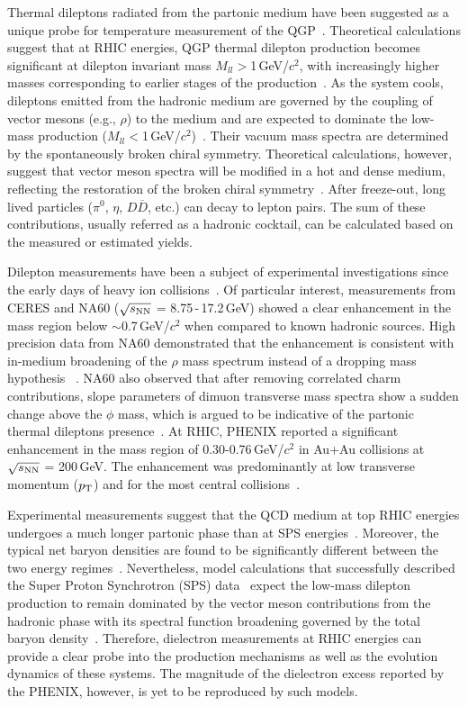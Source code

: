 \documentclass[twocolumn,showpacs,amsmath,amssymb,superscriptaddress,nofootinbib]{revtex4-1}
\newcommand{\sNN}{$\sqrt{s_{\rm NN}}$ }
\newcommand{\GeVcsq}{GeV/$c^2$ }
\begin{document}
Thermal dileptons radiated from the partonic medium have been suggested as a unique probe for temperature measurement of the QGP~\cite{Shuryak}.
Theoretical calculations suggest that at RHIC energies, QGP thermal dilepton production becomes significant at dilepton invariant mass $M_{ll}>$1\,GeV/$c^2$, with increasingly higher masses corresponding to earlier stages of the production~\cite{RappThermalEE}.
As the system cools, dileptons emitted from the hadronic medium are governed by the coupling of vector mesons (e.g., $\rho$) to the medium and are expected to dominate the low-mass production ($M_{ll}<$1\,GeV/$c^2$)~\cite{RappWambach}. Their vacuum mass spectra are determined by the spontaneously broken chiral symmetry. Theoretical calculations, however, suggest that vector meson spectra will be modified in a hot and dense medium, reflecting the restoration of the broken chiral symmetry~\cite{BrownRho,RappWambach2}.
After freeze-out, long lived particles ($\pi^0$, $\eta$, $D\overline{D}$, etc.) can decay to lepton pairs. The sum of these contributions, usually referred as a hadronic cocktail, can be calculated based on the measured or estimated yields.

Dilepton measurements have been a subject of experimental investigations since the early days of heavy ion collisions~\cite{DLS,HADES,HELIOS3,CERES,NA60,PHENIX}.
Of particular interest, measurements from CERES and NA60 (\sNN = 8.75\,-\,17.2\,GeV)
showed a clear enhancement in the mass region below $\sim$0.7\,\GeVcsq when compared to known hadronic sources. High precision data from NA60 demonstrated that the enhancement is consistent with in-medium broadening of the $\rho$ mass spectrum instead of a dropping mass hypothesis ~\cite{NA60,Rapp4SPS,Renk4SPS,Dusling4SPS,PHSD4SPS}. NA60 also observed that after removing correlated charm contributions, slope parameters of dimuon transverse mass spectra show a sudden change above the $\phi$ mass, which is argued to be indicative of the partonic thermal dileptons presence~\cite{NA60}.
At RHIC, PHENIX reported a significant enhancement in the mass region of 0.30-0.76\,GeV/$c^2$ in Au+Au collisions at \sNN = 200\,GeV. The enhancement was predominantly at low transverse momentum ($p_{\rm T}$) and for the most central collisions~\cite{PHENIX}.

Experimental measurements suggest that the QCD medium at top RHIC energies undergoes a much longer partonic phase than at SPS energies~\cite{STARwhitepaper}. Moreover, the typical net baryon densities are found to be significantly different between the two energy regimes~\cite{PiKPSpectra}. Nevertheless, model calculations that successfully described the Super Proton Synchrotron (SPS) data~\cite{Rapp4SPS,Renk4SPS,Dusling4SPS,PHSD4SPS} expect the low-mass dilepton production to remain dominated by the vector meson contributions from the hadronic phase  with its spectral function broadening governed by the total baryon density~\cite{RappThermalEE}.
Therefore, dielectron measurements at RHIC energies can provide a clear probe into the production mechanisms as well as the evolution dynamics of these systems.
The magnitude of the dielectron excess reported by the PHENIX, however, is yet to be reproduced by such models.
\end{document}
